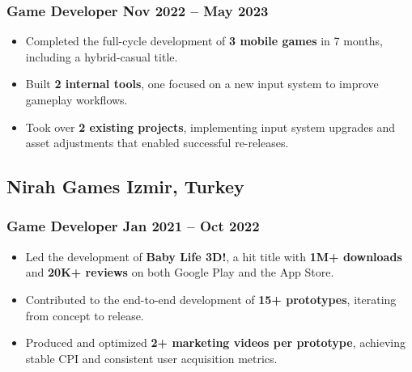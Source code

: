 \documentclass[11pt]{article}
\newcommand{\rside}[1]{
              \hfill {\normalfont\color{accent} #1}%
          }
\begin{document}
                                                                                      \subsubsection{Game Developer \rside{Nov 2022 -- May 2023}}
                                                                                      \begin{itemize}
                                                                                                \item Completed the full-cycle development of \textbf{3 mobile games} in 7 months, including a hybrid-casual title.
                                                                                                      \item Built \textbf{2 internal tools}, one focused on a new input system to improve gameplay workflows.
                                                                                                            \item Took over \textbf{2 existing projects}, implementing input system upgrades and asset adjustments that enabled successful re-releases.
                                                                                      \end{itemize}

                                                                                      \subsection{Nirah Games  \rside{Izmir, Turkey}}
                                                                                      \subsubsection{Game Developer \rside{Jan 2021 -- Oct 2022}}
                                                                                      \begin{itemize}
                                                                                                \item Led the development of \textbf{Baby Life 3D!}, a hit title with \textbf{1M+ downloads} and \textbf{20K+ reviews} on both Google Play and the App Store.
                                                                                                      \item Contributed to the end-to-end development of \textbf{15+ prototypes}, iterating from concept to release.
                                                                                                            \item Produced and optimized \textbf{2+ marketing videos per prototype}, achieving stable CPI and consistent user acquisition metrics.
                                                                                      \end{itemize}
\end{document}
